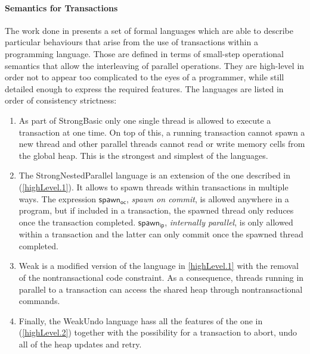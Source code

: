 \paragraph{Semantics for Transactions} The work done in \cite{semanticsTransactions} presents a set of formal languages which are able to describe particular behaviours that arise from the use of transactions within a programming language. Those are defined in terms of small-step operational semantics that allow the interleaving of parallel operations. They are high-level in order not to appear too complicated to the eyes of a programmer, while still detailed enough to express the required features. The languages are listed in order of consistency strictness:
\begin{enumerate}
	\item \label{highLevel.1} As part of \textsf{StrongBasic} only one single thread is allowed to execute a transaction at one time. On top of this, a running transaction cannot spawn a new thread and other parallel threads cannot read or write memory cells from the global heap. This is the strongest and simplest of the languages.
	
	\item The \textsf{StrongNestedParallel} language is an extension of the one described in (\ref{highLevel.1}). It allows to spawn threads within transactions in multiple ways. The expression $\mathsf{spawn_{oc}}$, \textit{spawn on commit}, is allowed anywhere in a program, but if included in a transaction, the spawned thread only reduces once the transaction completed. $\mathsf{spawn_{ip}}$, \textit{internally parallel}, is only allowed within a transaction and the latter can only commit once the spawned thread completed.
	
	\item \label{highLevel.2} \textsf{Weak} is a modified version of the language in \ref{highLevel.1} with the removal of the nontransactional code constraint. As a consequence, threads running in parallel to a transaction can access the shared heap through nontransactional commands.
	
	\item Finally, the \textsf{WeakUndo} language hass all the features of the one in (\ref{highLevel.2}) together with the possibility for a transaction to abort, undo all of the heap updates and retry.
\end{enumerate}